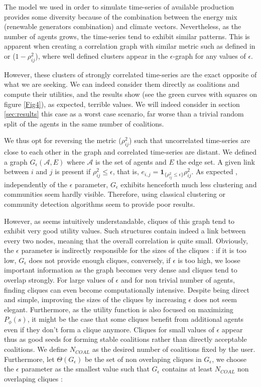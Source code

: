 \documentclass[conference]{IEEEtran}
\begin{document}
The model we used in order to simulate time-series of available production provides some diversity because of the combination between the energy mix (renewable generators combination) and climate vectors. Nevertheless, as the number of agents grows, the time-series tend to exhibit similar patterns. This is apparent when creating a correlation graph with similar metric such as defined in \cite{Garas2008} or \cite{Onnela2004} ($ 1 - \rho_{ij}^{2} $), where well defined clusters appear in the $ \epsilon $-graph for any values of $ \epsilon $. 

However, these clusters of strongly correlated time-series are the exact opposite of what we are seeking. We can indeed consider them directly as coalitions and compute their utilities, and the results show (see the green curves with squares on figure \ref{Fig4}), as expected, terrible values. We will indeed consider in section \ref{sec:results} this case as a worst case scenario, far worse than a trivial random split of the agents in the same number of coalitions. 

We thus opt for reversing the metric ($ \rho_{ij}^{2} $) such that uncorrelated time-series are close to each other in the graph and correlated time-series are distant. We defined a graph $G_\epsilon(\mathcal{A},E)$ where $\mathcal{A}$ is the set of agents and $ E $ the edge set. A given link between $ i $ and $ j $ is present if $ \rho_{ij}^{2} \leq \epsilon $, that is, $ e_{i,j} = \mathbf{1}_{\{\rho_{ij}^{2} \leq \epsilon \}}\rho_{ij}^{2} $. As expected \cite{Onnela2004}, independently of the $ \epsilon $ parameter, $ G_{\epsilon } $ exhibits henceforth much less clustering and communities seem hardly visible. Therefore, using classical clustering or community detection algorithms seem to provide poor results. 

However, as seems intuitively understandable, cliques of this graph tend to exhibit very good utility values. Such  structures contain indeed a link between every two nodes, meaning that the overall correlation is quite small. Obviously, the $ \epsilon $ parameter is indirectly responsible for the sizes of the cliques : if it is too low, $ G_{\epsilon} $ does not provide enough cliques, conversely, if $\epsilon $ is too high, we loose important information as the graph becomes very dense and cliques tend to overlap strongly. For large values of $ \epsilon $ and for non trivial number of agents, finding cliques can even become computationally intensive. Despite being direct and simple, improving the sizes of the cliques by increasing $ \epsilon $ does not seem elegant. Furthermore, as the utility function is also focused on maximizing $ P_{\phi}(s) $, it might be the case that some cliques benefit from additional agents even if they don't form a clique anymore. Cliques for small values of $ \epsilon $ appear thus as good seeds for forming stable coalitions rather than directly acceptable coalitions. We define $ N_{COAL} $ as the desired number of coalitions fixed by the user. Furthermore, let $ \Theta(G_{\epsilon}) $ be the set of non overlaping cliques in $ G_{\epsilon} $, we choose the $ \epsilon $ parameter as the smallest value such that $ G_{\epsilon} $ contains at least $ N_{COAL} $ non overlaping cliques :
\end{document}
